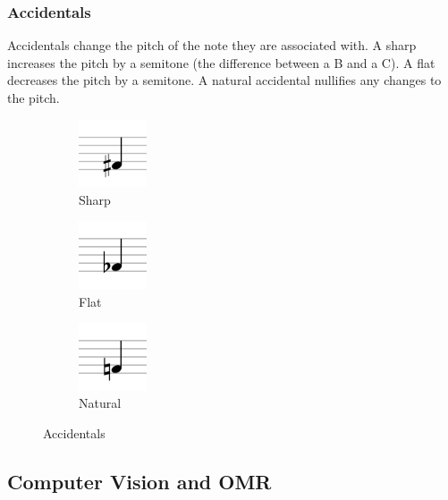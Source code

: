         \subsubsection{Accidentals}
            Accidentals change the pitch of the note they are associated with. A sharp increases the pitch by a semitone (the difference between a B and a C). A flat decreases the pitch by a semitone. A natural accidental nullifies any changes to the pitch.
            \begin{figure}[h!]
                \centering
                \begin{subfigure}{0.3\textwidth}
                    \centering
                    \includegraphics[width=20mm]{./assets/sharp.png}
                    \caption{Sharp}
                    \label{image:sharp}
                \end{subfigure}
                \begin{subfigure}{0.3\textwidth}
                    \centering
                    \includegraphics[width=20mm]{./assets/flat.png}
                    \caption{Flat}
                    \label{image:flat}
                \end{subfigure}
                \begin{subfigure}{0.3\textwidth}
                    \centering
                    \includegraphics[width=20mm]{./assets/natural.png}
                    \caption{Natural}
                    \label{image:natural}
                \end{subfigure}
                \caption{Accidentals}
                \label{image:accidentals}
            \end{figure}

    \subsection{Computer Vision and OMR}
